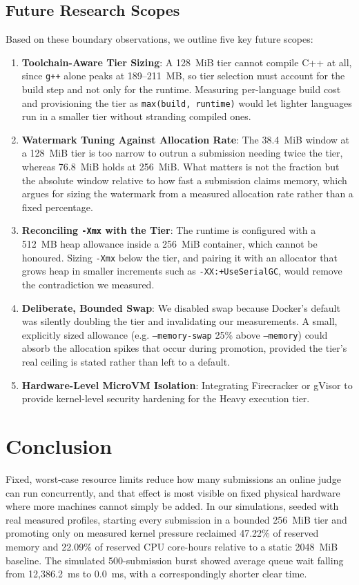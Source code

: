 \documentclass[conference]{IEEEtran}
\begin{document}
\subsection{Future Research Scopes}
Based on these boundary observations, we outline five key future scopes:
\begin{enumerate}
    \item \textbf{Toolchain-Aware Tier Sizing}: A 128~MiB tier cannot compile C++ at all, since \texttt{g++} alone peaks at 189--211~MB, so tier selection must account for the build step and not only for the runtime. Measuring per-language build cost and provisioning the tier as \texttt{max(build, runtime)} would let lighter languages run in a smaller tier without stranding compiled ones.
    \item \textbf{Watermark Tuning Against Allocation Rate}: The 38.4~MiB window at a 128~MiB tier is too narrow to outrun a submission needing twice the tier, whereas 76.8~MiB holds at 256~MiB. What matters is not the fraction but the absolute window relative to how fast a submission claims memory, which argues for sizing the watermark from a measured allocation rate rather than a fixed percentage.
    \item \textbf{Reconciling \texttt{-Xmx} with the Tier}: The runtime is configured with a 512~MB heap allowance inside a 256~MiB container, which cannot be honoured. Sizing \texttt{-Xmx} below the tier, and pairing it with an allocator that grows heap in smaller increments such as \texttt{-XX:+UseSerialGC}, would remove the contradiction we measured.
    \item \textbf{Deliberate, Bounded Swap}: We disabled swap because Docker's default was silently doubling the tier and invalidating our measurements. A small, explicitly sized allowance (e.g. \texttt{--memory-swap} 25\% above \texttt{--memory}) could absorb the allocation spikes that occur during promotion, provided the tier's real ceiling is stated rather than left to a default.
    \item \textbf{Hardware-Level MicroVM Isolation}: Integrating Firecracker or gVisor to provide kernel-level security hardening for the Heavy execution tier.
\end{enumerate}

\section{Conclusion}
Fixed, worst-case resource limits reduce how many submissions an online judge can run concurrently, and that effect is most visible on fixed physical hardware where more machines cannot simply be added. In our simulations, seeded with real measured profiles, starting every submission in a bounded 256~MiB tier and promoting only on measured kernel pressure reclaimed 47.22\% of reserved memory and 22.09\% of reserved CPU core-hours relative to a static 2048~MiB baseline. The simulated 500-submission burst showed average queue wait falling from 12,386.2~ms to 0.0~ms, with a correspondingly shorter clear time.
\end{document}
